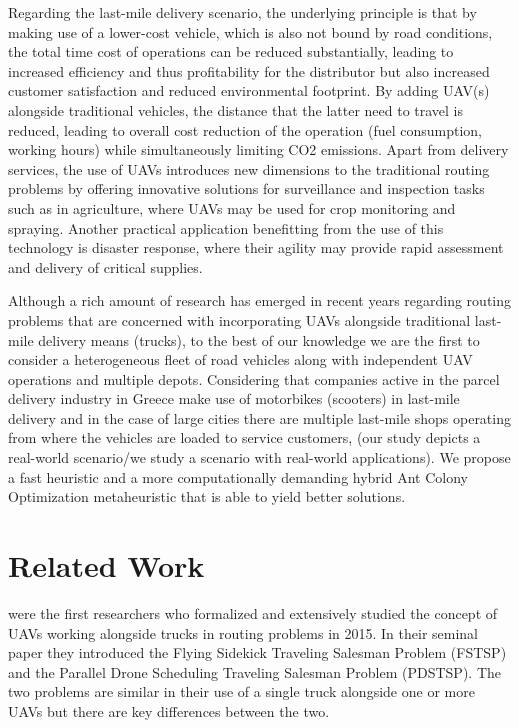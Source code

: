 \documentclass{article}
\begin{document}
	Regarding the last-mile delivery scenario, the underlying principle is that by making use of a lower-cost vehicle, which is also not bound by road conditions, the total time cost of operations can be reduced substantially, leading to increased efficiency and thus profitability for the distributor but also increased customer satisfaction and reduced environmental footprint. By adding UAV(s) alongside traditional vehicles, the distance that the latter need to travel is reduced, leading to overall cost reduction of the operation (fuel consumption, working hours) while simultaneously limiting CO2 emissions.
	Apart from delivery services, the use of UAVs introduces new dimensions to the traditional routing problems by offering innovative solutions for surveillance and inspection tasks such as in agriculture, where UAVs may be used for crop monitoring and spraying. Another practical application benefitting from the use of this technology is disaster response, where their agility may provide rapid assessment and delivery of critical supplies.
	\par
	Although a rich amount of research has emerged in recent years regarding routing problems that are concerned with incorporating UAVs alongside traditional last-mile delivery means (trucks), to the best of our knowledge we are the first to consider a heterogeneous fleet of road vehicles along with independent UAV operations and multiple depots. Considering that companies active in the parcel delivery industry in Greece make use of motorbikes (scooters) in last-mile delivery and in the case of large cities there are multiple last-mile shops operating from where the vehicles are loaded to service customers,
	(our study depicts a real-world scenario/we study a scenario with real-world applications). We propose a fast heuristic and a more computationally demanding hybrid Ant Colony Optimization metaheuristic that is able to yield better solutions.
	\par
	
	\section{Related Work}
	\citeauthor{Murray2015} \cite{Murray2015} were the first researchers who formalized and extensively studied the concept of UAVs working alongside trucks in routing problems in 2015. In their seminal paper they introduced the Flying Sidekick Traveling Salesman Problem (FSTSP) and the Parallel Drone Scheduling Traveling Salesman Problem (PDSTSP). The two problems are similar in their use of a single truck alongside one or more UAVs but there are key differences between the two.
	\par
\end{document}
